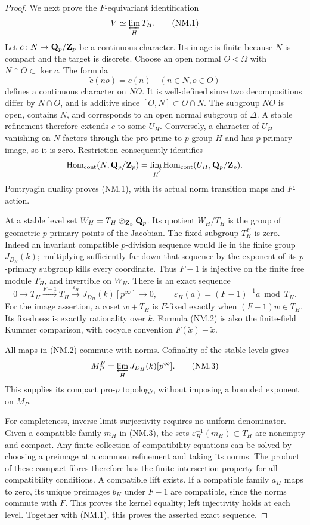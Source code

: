 \begin{proof}
We next prove the $F$-equivariant identification
\[
                    V\simeq\varprojlim_H T_H.                 \tag{NM.1}
\]
Let $c:N\to\mathbf Q_p/\mathbf Z_p$ be a continuous character. Its image is
finite because $N$ is compact and the target is discrete. Choose
an open normal $O\triangleleft\Omega$ with
$N\cap O\subset\ker c$. The formula
\[
                  \widetilde c(no)=c(n)\quad(n\in N,o\in O)
\]
defines a continuous character on $NO$. It is well-defined since
two decompositions differ by $N\cap O$, and is additive since
$[O,N]\subset O\cap N$. The subgroup $NO$ is open, contains $N$,
and corresponds to an open normal subgroup of $\Delta$. A stable
refinement therefore extends $c$ to some $U_H$. Conversely, a
character of $U_H$ vanishing on $N$ factors through the
pro-prime-to-$p$ group $H$ and has $p$-primary image, so it is
zero. Restriction consequently identifies
\[
 \operatorname{Hom}_{\mathrm{cont}}(N,\mathbf Q_p/\mathbf Z_p)
 =\varinjlim_H\operatorname{Hom}_{\mathrm{cont}}(U_H,\mathbf Q_p/\mathbf Z_p).
\]
Pontryagin duality proves (NM.1), with its actual norm transition
maps and $F$-action.

At a stable level set $W_H=T_H\otimes_{\mathbf Z_p}\mathbf Q_p$. Its quotient
$W_H/T_H$ is the group of geometric $p$-primary points of the
Jacobian. The fixed subgroup $T_H^F$ is zero. Indeed an invariant
compatible $p$-division sequence would lie in the finite group
$J_{D_H}(k)$; multiplying sufficiently far down that sequence by
the exponent of its $p$-primary subgroup kills every coordinate.
Thus $F-1$ is injective on the finite free module $T_H$, and
invertible on $W_H$. There is an exact sequence
\[
 0\longrightarrow T_H\xrightarrow{F-1}T_H
 \xrightarrow{\varepsilon_H} J_{D_H}(k)[p^\infty]
 \longrightarrow0,\qquad
 \varepsilon_H(a)=(F-1)^{-1}a\bmod T_H.                       \tag{NM.2}
\]
For the image assertion, a coset $w+T_H$ is $F$-fixed exactly
when $(F-1)w\in T_H$. Its fixedness is exactly rationality over
$k$. Formula (NM.2) is also the finite-field Kummer comparison,
with cocycle convention $F(\widetilde x)-\widetilde x$.

All maps in (NM.2) commute with norms. Cofinality of the stable
levels gives
\[
 M_P^F=\varprojlim_H J_{D_H}(k)[p^\infty].                    \tag{NM.3}
\]
This supplies its compact pro-$p$ topology, without imposing a
bounded exponent on $M_P$.

For completeness, inverse-limit surjectivity requires no uniform
denominator. Given a compatible family $m_H$ in (NM.3), the sets
$\varepsilon_H^{-1}(m_H)\subset T_H$ are nonempty and compact.
Any finite collection of compatibility equations can be solved by
choosing a preimage at a common refinement and taking its norms.
The product of these compact fibres therefore has the finite
intersection property for all compatibility conditions. A compatible
lift exists. If a compatible family $a_H$ maps to zero, its unique
preimages $b_H$ under $F-1$ are compatible, since the norms commute
with $F$. This proves the kernel equality; left injectivity holds
at each level. Together with (NM.1), this proves the asserted
exact sequence.


\end{proof}
